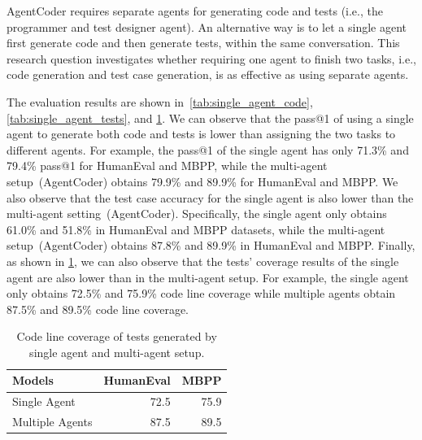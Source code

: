 \documentclass{article}
\newcommand{\xxx}{AgentCoder\xspace}
\begin{document}
\xxx requires separate agents for generating code and tests (i.e., the programmer and test designer agent). An alternative way is to let a single agent first generate code and then generate tests, within the same conversation.
This research question investigates 
whether requiring one agent to finish two tasks, i.e., code generation and test case generation, is as effective as using separate agents. 

\begin{table}
    \centering
    \caption{Pass@1 for a single agent and multiple agents.}
    \label{tab:single_agent_code}
    \vspace{-0.3cm}
\end{table}



The evaluation results are shown in~\cref{tab:single_agent_code}, \cref{tab:single_agent_tests}, and \cref{tab:rq6_coverage}. We can observe that the pass@1 of using a single agent to generate both code and tests is lower than assigning the two tasks to different agents. For example, the pass@1 of the single agent has only  71.3\% and 79.4\% pass@1 for HumanEval and MBPP, while the multi-agent setup~(\xxx) obtains 79.9\% and 89.9\% for HumanEval and MBPP. We also observe that the test case accuracy for the single agent is also lower than the multi-agent setting~(\xxx). Specifically, the single agent only obtains 61.0\% and 51.8\% in HumanEval and MBPP datasets, while the multi-agent setup~(\xxx) obtains 87.8\% and 89.9\% in HumanEval and MBPP. 
Finally, as shown in \cref{tab:rq6_coverage}, we can also observe that the tests' coverage results of the single agent are also lower than in the multi-agent setup. For example, the single agent only obtains 72.5\% and 75.9\% code line coverage while multiple agents obtain 87.5\% and 89.5\% code line coverage.

\begin{table}\scriptsize
    \centering
    \caption{Code line coverage of tests generated by single agent and multi-agent setup. }
    \begin{tabular}{lrr}
    \toprule
    Models&HumanEval&MBPP\\
    \midrule
        Single Agent&72.5&75.9\\
         Multiple Agents&87.5&89.5\\
         \bottomrule
    \end{tabular}
    \label{tab:rq6_coverage}
\end{table}
\end{document}
